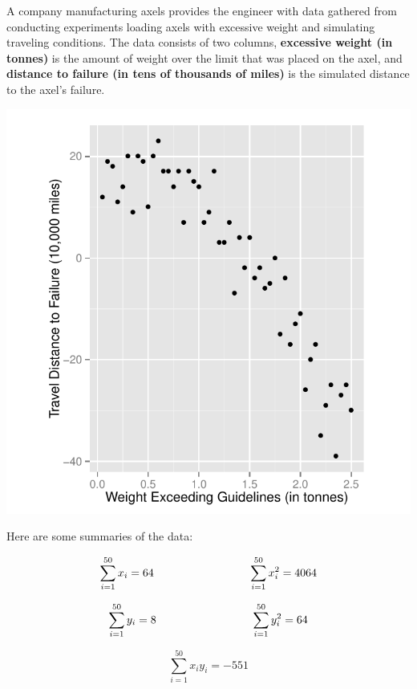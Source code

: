 \documentclass[addpoints]{examsetup}\usepackage[]{graphicx}\usepackage[]{color}
\newenvironment{knitrout}{}{} %
\begin{document}
\begin{questions}
A company manufacturing axels provides the engineer with data gathered from conducting experiments loading axels with excessive weight and simulating traveling conditions.
The data consists of two columns, \textbf{excessive weight (in tonnes)} is the amount of weight over the limit that was placed on the axel, and 
\textbf{distance to failure (in tens of thousands of miles)} is the simulated distance to the axel's failure. 



\begin{center}
\begin{knitrout}
\color{fgcolor}
\includegraphics[width=.5\linewidth]{figure/unnamed-chunk-7-1} 

\end{knitrout}
\end{center}

Here are some summaries of the data:

$$
\sum_{i=1}^{50} x_i = 64 \hspace{3cm} \sum_{i=1}^{50} x_i^2 = 4064 \\
$$

$$
\sum_{i=1}^{50} y_i = 8 \hspace{3cm} \sum_{i=1}^{50} y_i^2 = 64 \\
$$

$$
\sum_{i=1}^{50} x_i y_i = \ensuremath{-551}
$$

\end{questions}
\end{document}
